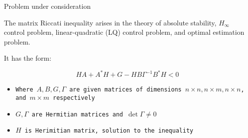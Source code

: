 \begin{frame}{Problem under consideration}



The matrix Riccati inequality arises in the theory of absolute stability, $H_{\infty}$ control problem, linear-quadratic (LQ) control problem, and optimal estimation problem. 
	
	\begin{block}{It has the form:}

\begin{equation*}
HA + A^{*}H + G - HB\Gamma ^{-1}B^{*}H < 0
\end{equation*}
\end{block}

\begin{itemize}
		\item \texttt{Where $A, B, G, \Gamma $ are given matrices of dimensions $n\times n, n\times m,
n\times n$, and $m\times m$ respectively }
		\item \texttt{$G, \Gamma $ are Hermitian matrices and $\det \Gamma
\neq 0$ }
\item \texttt{$ H$ is Herimitian matrix, solution to the inequality }
		
	\end{itemize}


\end{frame}


